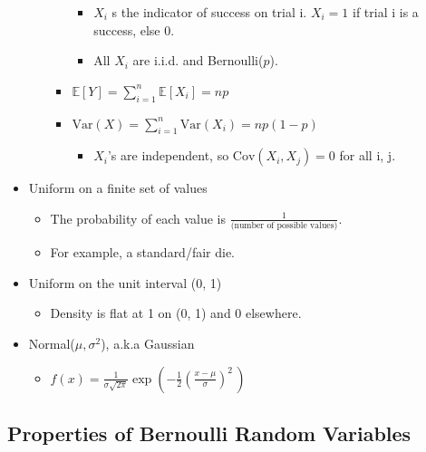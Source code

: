 \documentclass[
  letterpaper,
  DIV=11,
  numbers=noendperiod]{scrreprt}
\providecommand{\tightlist}{%
  \setlength{\itemsep}{0pt}\setlength{\parskip}{0pt}}\usepackage{longtable,booktabs,array}
\begin{document}
\begin{itemize}
\begin{itemize}
\begin{itemize}
      \begin{itemize}
      \tightlist
      \item
        \(X_i\) s the indicator of success on trial i. \(X_i = 1\) if
        trial i is a success, else 0.
      \item
        All \(X_i\) are i.i.d. and Bernoulli(\(p\)).
      \end{itemize}
    \item
      \(\mathbb{E}[Y] = \sum_{i=1}^n \mathbb{E}[X_i] = np\)
    \item
      \(\text{Var}(X) = \sum_{i=1}^n \text{Var}(X_i) = np(1-p)\)

      \begin{itemize}
      \tightlist
      \item
        \(X_i\)'s are independent, so \(\text{Cov}(X_i, X_j) = 0\) for
        all i, j.
      \end{itemize}
    \end{itemize}
  \end{itemize}
\item
  Uniform on a finite set of values

  \begin{itemize}
  \tightlist
  \item
    The probability of each value is
    \(\frac{1}{\text{(number of possible values)}}\).
  \item
    For example, a standard/fair die.
  \end{itemize}
\item
  Uniform on the unit interval (0, 1)

  \begin{itemize}
  \tightlist
  \item
    Density is flat at 1 on (0, 1) and 0 elsewhere.
  \end{itemize}
\item
  Normal(\(\mu, \sigma^2\)), a.k.a Gaussian

  \begin{itemize}
  \tightlist
  \item
    \(f(x) = \frac{1}{\sigma\sqrt{2\pi}} \exp\left( -\frac{1}{2}\left(\frac{x-\mu}{\sigma}\right)^{\!2}\,\right)\)
  \end{itemize}
\end{itemize}

\subsection{Properties of Bernoulli Random
Variables}\label{properties-of-bernoulli-random-variables}
\end{document}
